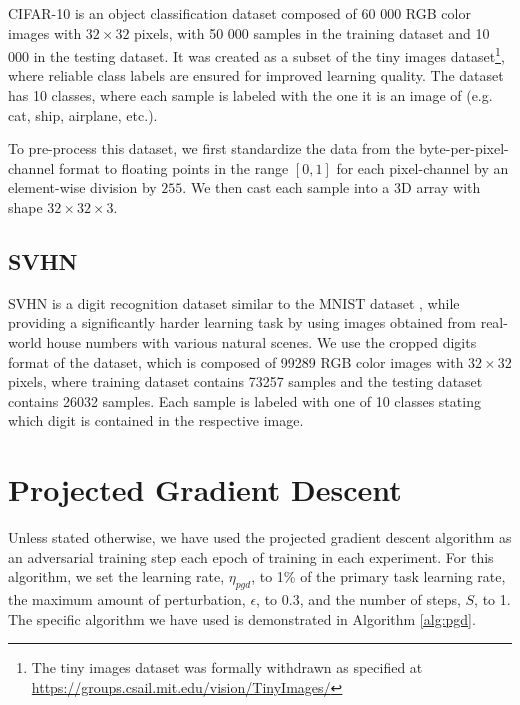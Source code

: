 \documentclass[conference,compsoc]{IEEEtran}
\begin{document}
CIFAR-10 \cite{krizhevsky2009learning} is an object classification dataset composed of 60 000 RGB color images with $32 \times 32$ pixels, with 50 000 samples in the training dataset and 10 000 in the testing dataset. It was created as a subset of the tiny images dataset\footnote{The tiny images dataset was formally withdrawn as specified at \url{https://groups.csail.mit.edu/vision/TinyImages/}}, where reliable class labels are ensured for improved learning quality. The dataset has 10 classes, where each sample is labeled with the one it is an image of (e.g. cat, ship, airplane, etc.).

\noindent To pre-process this dataset, we first standardize the data from the byte-per-pixel-channel format to floating points in the range $[0, 1]$ for each pixel-channel by an element-wise division by $255$. We then cast each sample into a 3D array with shape $32 \times 32 \times 3$.

\subsection{SVHN}

SVHN \cite{netzer2011svhn} is a digit recognition dataset similar to the MNIST dataset \cite{lecun1998gradient}, while providing a significantly harder learning task by using images obtained from real-world house numbers with various natural scenes. We use the cropped digits format of the dataset, which is composed of 99289 RGB color images with $32 \times 32$ pixels, where training dataset contains 73257 samples and the testing dataset contains 26032 samples. Each sample is labeled with one of 10 classes stating which digit is contained in the respective image.


\section{Projected Gradient Descent}

Unless stated otherwise, we have used the projected gradient descent algorithm \cite{goodfellow2014explaining} as an adversarial training step each epoch of training in each experiment. For this algorithm, we set the learning rate, $\eta_{pgd}$, to 1\% of the primary task learning rate, the maximum amount of perturbation, $\epsilon$, to $0.3$, and the number of steps, $S$, to 1. The specific algorithm we have used is demonstrated in Algorithm \ref{alg:pgd}.
\end{document}
